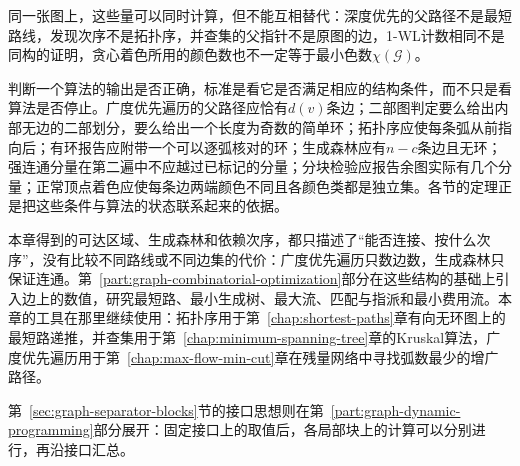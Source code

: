 同一张图上，这些量可以同时计算，但不能互相替代：深度优先的父路径不是最短路线，发现次序不是拓扑序，并查集的父指针不是原图的边，1-WL计数相同不是同构的证明，贪心着色所用的颜色数也不一定等于最小色数$\chi(\mathcal G)$。

判断一个算法的输出是否正确，标准是看它是否满足相应的结构条件，而不只是看算法是否停止。广度优先遍历的父路径应恰有$d(v)$条边；二部图判定要么给出内部无边的二部划分，要么给出一个长度为奇数的简单环；拓扑序应使每条弧从前指向后；有环报告应附带一个可以逐弧核对的环；生成森林应有$n-c$条边且无环；强连通分量在第二遍中不应越过已标记的分量；分块检验应报告余图实际有几个分量；正常顶点着色应使每条边两端颜色不同且各颜色类都是独立集。各节的定理正是把这些条件与算法的状态联系起来的依据。

本章得到的可达区域、生成森林和依赖次序，都只描述了“能否连接、按什么次序”，没有比较不同路线或不同边集的代价：广度优先遍历只数边数，生成森林只保证连通。第~\ref{part:graph-combinatorial-optimization}部分在这些结构的基础上引入边上的数值，研究最短路、最小生成树、最大流、匹配与指派和最小费用流。本章的工具在那里继续使用：拓扑序用于第~\ref{chap:shortest-paths}章有向无环图上的最短路递推，并查集用于第~\ref{chap:minimum-spanning-tree}章的Kruskal算法，广度优先遍历用于第~\ref{chap:max-flow-min-cut}章在残量网络中寻找弧数最少的增广路径。

第~\ref{sec:graph-separator-blocks}节的接口思想则在第~\ref{part:graph-dynamic-programming}部分展开：固定接口上的取值后，各局部块上的计算可以分别进行，再沿接口汇总。
